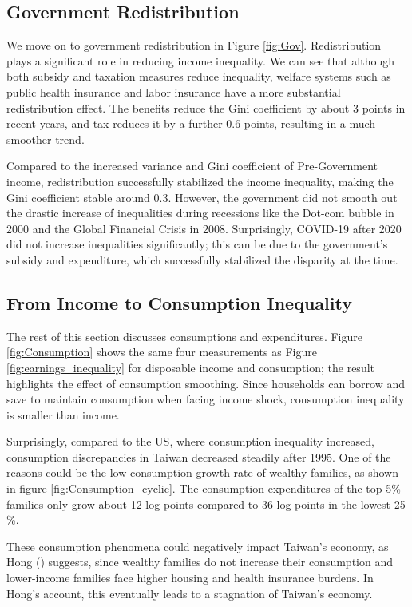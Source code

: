 \documentclass{article}
\begin{document}
\newpage

\subsection{Government Redistribution}

We move on to government redistribution in Figure \ref{fig:Gov}. Redistribution plays a significant role in reducing income inequality. We can see that although both subsidy and taxation measures reduce inequality, welfare systems such as public health insurance and labor insurance have a more substantial redistribution effect. The benefits reduce the Gini coefficient by about 3 points in recent years, and tax reduces it by a further 0.6 points, resulting in a much smoother trend.

Compared to the increased variance and Gini coefficient of Pre-Government income, redistribution successfully stabilized the income inequality, making the Gini coefficient stable around 0.3. However, the government did not smooth out the drastic increase of inequalities during recessions like the Dot-com bubble in 2000 and the Global Financial Crisis in 2008. Surprisingly, COVID-19 after 2020 did not increase inequalities significantly; this can be due to the government's subsidy and expenditure, which successfully stabilized the disparity at the time.

\subsection{From Income to Consumption Inequality}

The rest of this section discusses consumptions and expenditures. Figure \ref{fig:Consumption} shows the same four measurements as Figure \ref{fig:earnings_inequality} for disposable income and consumption; the result highlights the effect of consumption smoothing. Since households can borrow and save to maintain consumption when facing income shock, consumption inequality is smaller than income.

Surprisingly, compared to the US, where consumption inequality increased, consumption discrepancies in Taiwan decreased steadily after 1995. One of the reasons could be the low consumption growth rate of wealthy families, as shown in figure \ref{fig:Consumption_cyclic}. The consumption expenditures of the top 5\% families only grow about 12 log points compared to 36 log points in the lowest 25 \%. 

These consumption phenomena could negatively impact Taiwan's economy, as Hong (\citeyear{TW_consumption_inequality}) suggests, since wealthy families do not increase their consumption and lower-income families face higher housing and health insurance burdens. In Hong's account, this eventually leads to a stagnation of Taiwan's economy.
\end{document}
